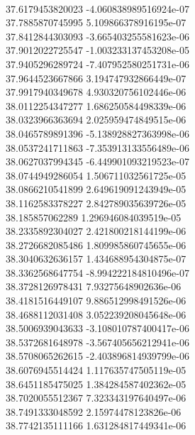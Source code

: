 { \\
37.6179453820023 -4.060838989516924e-07
 \\
37.7885870745995 5.109866378916195e-07
 \\
37.8412844303093 -3.665403255581623e-06
 \\
37.9012022725547 -1.003233137453208e-05
 \\
37.9405296289724 -7.407952580251731e-06
 \\
37.9644523667866 3.194747932866449e-07
 \\
37.9917940349678 4.930320756102446e-06
 \\
38.0112254347277 1.686250584498339e-06
 \\
38.0323966363694 2.025959474849515e-06
 \\
38.0465789891396 -5.138928827363998e-06
 \\
38.0537241711863 -7.353913133556489e-06
 \\
38.0627037994345 -6.449901093219523e-07
 \\
38.0744949286054 1.506711032561725e-05
 \\
38.0866210541899 2.649619091243949e-05
 \\
38.1162583378227 2.842789035639726e-05
 \\
38.185857062289 1.296946084039519e-05
 \\
38.2335892304027 2.421800218144199e-06
 \\
38.2726682085486 1.809985860745655e-06
 \\
38.3040632636157 1.434688954304875e-07
 \\
38.3362568647754 -8.994222184810496e-07
 \\
38.3728126978431 7.93275648902636e-06
 \\
38.4181516449107 9.886512998491526e-06
 \\
38.4688112031408 3.052239208045648e-06
 \\
38.5006939043633 -3.108010787400417e-06
 \\
38.5372681648978 -3.567405656212941e-06
 \\
38.5708065262615 -2.403896814939799e-06
 \\
38.6076945514424 1.117635747505119e-05
 \\
38.6451185475025 1.384284587402362e-05
 \\
38.7020055512367 7.323343197640497e-06
 \\
38.7491333048592 2.15974478123826e-06
 \\
38.7742135111166 1.631284817449341e-06
 \\
}
